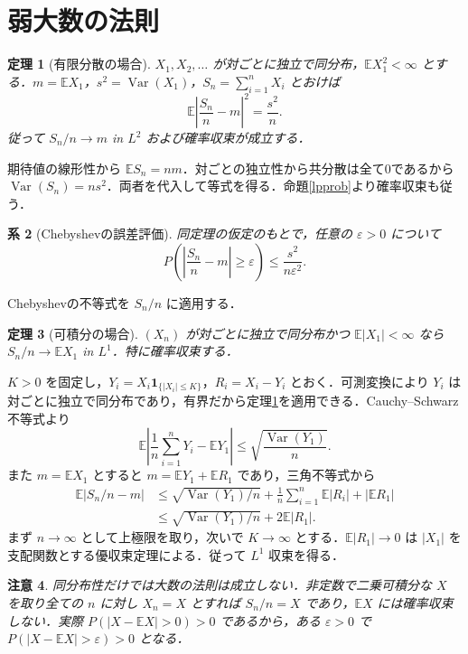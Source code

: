 \documentclass[a5paper,10pt,onecolumn]{jsarticle}
\makeatletter
\theoremstyle{mathnotetheorem}
\newtheorem{theorem}{定理}[section]
\newtheorem{corollary}[theorem]{系}
\newtheorem{remark}[theorem]{注意}
\renewcommand{\proofname}{証明}
\renewenvironment{proof}[1][\proofname]{%
  \par\pushQED{\qed}\normalfont\topsep4\p@\@plus2\p@\relax
  \trivlist\item[\hskip\labelsep\bfseries #1]\ignorespaces
}{\popQED\endtrivlist\@endpefalse}
\newcommand{\E}{\mathbb E}
\newcommand{\1}{\mathbf{1}}
\DeclareMathOperator{\Var}{Var}
\makeatother
\begin{document}
\section{弱大数の法則}
\begin{theorem}[有限分散の場合]\label{weaklln2}
$X_1,X_2,\ldots$ が対ごとに独立で同分布，$\E X_1^2<\infty$ とする．$m=\E X_1$，$s^2=\Var(X_1)$，$S_n=\sum_{i=1}^nX_i$ とおけば
\[
 \E\left|\frac{S_n}{n}-m\right|^2=\frac{s^2}{n}.
\]
従って $S_n/n\to m$ in $L^2$ および確率収束が成立する．
\end{theorem}
\begin{proof}
期待値の線形性から $\E S_n=nm$．対ごとの独立性から共分散は全て0であるから $\Var(S_n)=ns^2$．両者を代入して等式を得る．命題\ref{lpprob}より確率収束も従う．
\end{proof}
\begin{corollary}[Chebyshevの誤差評価]
同定理の仮定のもとで，任意の $\varepsilon>0$ について
\[
 P\left(\left|\frac{S_n}{n}-m\right|\ge\varepsilon\right)
 \le\frac{s^2}{n\varepsilon^2}.
\]
\end{corollary}
\begin{proof}
Chebyshevの不等式を $S_n/n$ に適用する．
\end{proof}
\begin{theorem}[可積分の場合]\label{weaklln1}
$(X_n)$ が対ごとに独立で同分布かつ $\E|X_1|<\infty$ なら $S_n/n\to\E X_1$ in $L^1$．特に確率収束する．
\end{theorem}
\begin{proof}
$K>0$ を固定し，$Y_i=X_i\1_{\{|X_i|\le K\}}$，$R_i=X_i-Y_i$ とおく．可測変換により $Y_i$ は対ごとに独立で同分布であり，有界だから定理\ref{weaklln2}を適用できる．Cauchy--Schwarz不等式より
\[
 \E\left|\frac1n\sum_{i=1}^nY_i-\E Y_1\right|
 \le\sqrt{\frac{\Var(Y_1)}n}.
\]
また $m=\E X_1$ とすると $m=\E Y_1+\E R_1$ であり，三角不等式から
\begin{align*}
 \E|S_n/n-m|&\le\sqrt{\Var(Y_1)/n}
 +\frac1n\sum_{i=1}^n\E|R_i|+|\E R_1|\\
 &\le\sqrt{\Var(Y_1)/n}+2\E|R_1|.
\end{align*}
まず $n\to\infty$ として上極限を取り，次いで $K\to\infty$ とする．$\E|R_1|\to0$ は $|X_1|$ を支配関数とする優収束定理による．従って $L^1$ 収束を得る．
\end{proof}
\begin{remark}
同分布性だけでは大数の法則は成立しない．非定数で二乗可積分な $X$ を取り全ての $n$ に対し $X_n=X$ とすれば $S_n/n=X$ であり，$\E X$ には確率収束しない．実際 $P(|X-\E X|>0)>0$ であるから，ある $\varepsilon>0$ で $P(|X-\E X|>\varepsilon)>0$ となる．
\end{remark}
\end{document}
